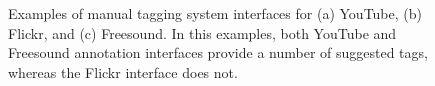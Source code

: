 \begin{figure}[t]
  \centering
  \hspace{0.5cm}
  \caption[Examples of manual tagging system interfaces]{Examples of manual tagging system interfaces for (a) YouTube, (b) Flickr, and (c) Freesound. In this examples, both YouTube and Freesound annotation interfaces provide a number of suggested tags, whereas the Flickr interface does not.}
  \label{fig:manual_tagging_interfaces}
\end{figure}


